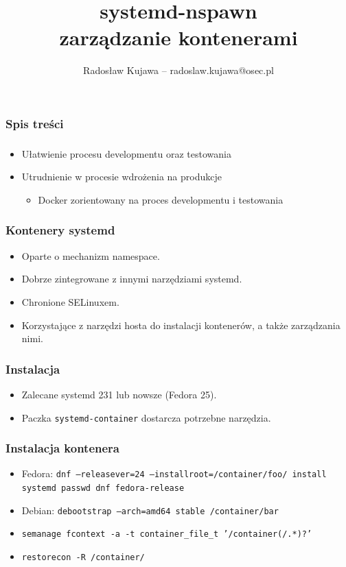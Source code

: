 \documentclass[dvipsnames,table]{beamer}
\title{systemd-nspawn \\ zarządzanie kontenerami}
\author{Radosław Kujawa -- radoslaw.kujawa@osec.pl}
\institute{OSEC}
\begin{document}
\begin{frame}
	\titlepage
\end{frame}

\begin{frame}[allowframebreaks]
	\frametitle{Spis treści}
	{
		\hypersetup{colorlinks=true,linkcolor=black,urlcolor=OSEC-red}
		\tableofcontents
	}
\end{frame}


\begin{frame}
\frametitle{}
\begin{itemize}
	\item Ułatwienie procesu developmentu oraz testowania 
	\item Utrudnienie w procesie wdrożenia na produkcje
	\begin{itemize}
		\item Docker zorientowany na proces developmentu i testowania
	\end{itemize}
\end{itemize}
\end{frame}

\begin{frame}
\frametitle{Kontenery systemd}
\begin{itemize}
	\item Oparte o mechanizm namespace.
	\item Dobrze zintegrowane z innymi narzędziami systemd.
	\item Chronione SELinuxem.
	\item Korzystające z narzędzi hosta do instalacji kontenerów, a także zarządzania nimi.
\end{itemize}
\end{frame}

\begin{frame}
\frametitle{Instalacja}
\begin{itemize}
	\item Zalecane systemd 231 lub nowsze (Fedora 25).
	\item Paczka {\tt systemd-container} dostarcza potrzebne narzędzia.
\end{itemize}
\end{frame}

\begin{frame}
\frametitle{Instalacja kontenera}
\begin{itemize}
	\item Fedora: {\tt dnf --releasever=24 --installroot=/container/foo/ install systemd passwd dnf fedora-release}
	\item Debian: {\tt debootstrap --arch=amd64 stable /container/bar}
	\item {\tt semanage fcontext -a -t container\_file\_t '/container(/.*)?'}
	\item {\tt restorecon -R /container/}
\end{itemize}	
\end{frame}
\end{document}
